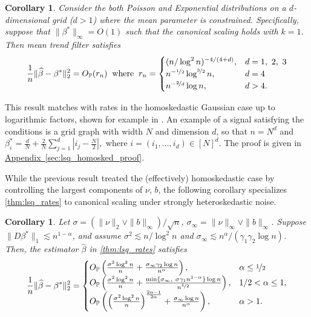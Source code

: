 \documentclass[ejs,noshowframe]{imsart}
\theoremstyle{plain}
\newtheorem{corollary}[theorem]{Corollary}
\theoremstyle{definition}
\newcommand{\aref}[1]{\hyperref[#1]{Appendix~\ref*{#1}}}
\renewcommand{\P}{\mathbb{P}}
\newcommand{\snorm}[1]{\lVert #1 \rVert}
\renewcommand{\hat}{\widehat}
\newcommand{\half}{\nicefrac{1}{2}}
\begin{document}
\begin{corollary}
\label{cor:mean_tf_weak_hetero}
Consider the both Poisson and Exponential distributions on a $d$-dimensional grid ($d >
1$) where the mean parameter is constrained. 
Specifically, suppose that $\| \beta^* \|_\infty = O(1)$ such that the canonical
scaling holds with $k=1$. 
Then mean trend filter satisfies
\[
  \frac 1n \|\hat \beta - \beta^*\|_2^2 = O_\P(r_n)\;\; \text{where}\;\; r_n =
  \begin{cases}
      (n/\log^2 n)^{-4/(4+d)},& d=1,\ 2,\ 3\\
      n^{-\half} \log^{\nicefrac{3}{2}} n,  & d = 4\\
      n^{-\nicefrac{2}{d}} \log n, & d > 4.\\
  \end{cases}
\]
\end{corollary}

This result matches with rates in the 
homoskedastic Gaussian case up to logarithmic factors, shown for example in 
\cite{sadhanala2021multivariate}. An example of a signal satisfying the
conditions is a grid graph
with width $N$ and dimension $d$, so that $n = N^d$ and  
$\beta_i^* = \frac dN + \frac 2N \sum_{j=1}^d |i_j - \frac{N}{2}|,$
where $i = (i_1, \dots, i_d) \in [N]^d$.
The proof is given in \aref{sec:lsq_homosked_proof}.



While the previous result treated the (effectively) homoskedastic case by controlling the
largest components of $\nu$, $b$, the following corollary specializes 
\autoref{thm:lsq_rates} to canonical scaling under strongly heteroskedastic 
noise. 



\begin{corollary}
	\label{cor:mtf_grids_hetero2}
	Let $\sigma =  (\| \nu \|_2\vee \| b \|_\infty) /\sqrt{n}$,
	$\sigma_\infty = \| \nu \|_\infty \vee \| b \|_\infty$.
	Suppose $\|D \beta^* \|_1 \lesssim n^{1-\alpha}$, and 
  assume $\sigma^2\lesssim n / \log^2 n$ and $\sigma_\infty \lesssim n^\alpha /
  (\gamma_1\gamma_2\log n)$.
  Then, the estimator $\hat\beta$ in \autoref{thm:lsq_rates}
  satisfies 
  \begin{equation}
    \frac{1}{n} \snorm{\hat\beta - \beta^*}_2^2 =
    \begin{cases}
      O_\P\left(\frac{\sigma^2\log^2 n}{n} + 
      \frac{\sigma_\infty\gamma_2\log n}{n^\alpha}
      \right), & \alpha\leq \half\\
      O_\P\left( \frac{\sigma^2\log^2 n}{n} +
      \frac{\min\{\sigma_\infty,\ \sigma\gamma_1n^{1-\alpha}\} \log n}{n^{\half}}\right),
               & 1/2 < \alpha \leq 1, \\
      O_\P\left(\left(\frac{\sigma^2\log^2 
      n}{n}\right)^{\frac{2\alpha-1}{2\alpha}} +
      \frac{\sigma_\infty\log n}{n^\alpha}
      \right), & \alpha > 1.
    \end{cases}
  \end{equation}
\end{corollary}
\end{document}
